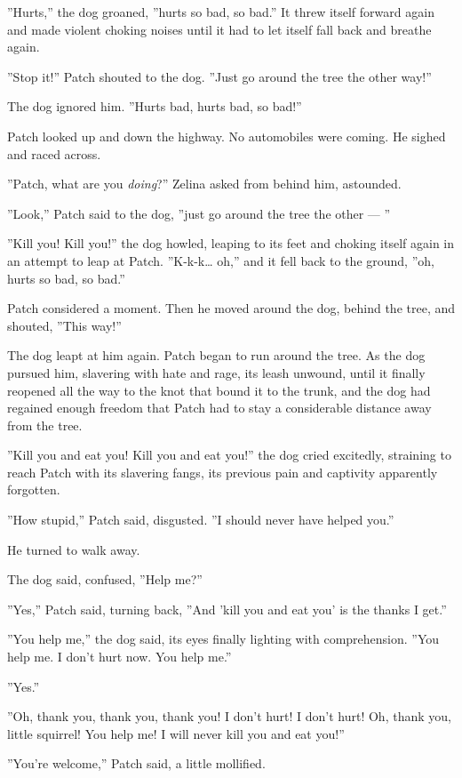 \documentclass[12pt]{book}
\begin{document}
''Hurts,'' the dog groaned, ''hurts so bad, so bad.'' It threw itself forward again and made violent choking noises until it had to let itself fall back and breathe again.

''Stop it!'' Patch shouted to the dog. ''Just go around the tree the other way!''

The dog ignored him. ''Hurts bad, hurts bad, so bad!''

Patch looked up and down the highway. No automobiles were coming. He sighed and raced across.

''Patch, what are you {\it doing}?'' Zelina asked from behind him, astounded.

''Look,'' Patch said to the dog, ''just go around the tree the other ---
''

''Kill you! Kill you!'' the dog howled, leaping to its feet and choking itself again in an attempt to leap at Patch. ''K-k-k\ldots{}
oh,'' and it fell back to the ground, ''oh, hurts so bad, so bad.''

Patch considered a moment. Then he moved around the dog, behind the tree, and shouted, ''This way!''

The dog leapt at him again. Patch began to run around the tree. As the dog pursued him, slavering with hate and rage, its leash unwound, until it finally reopened all the way to the knot that bound it to the trunk, and the dog had regained enough freedom that Patch had to stay a considerable distance away from the tree.

''Kill you and eat you! Kill you and eat you!'' the dog cried excitedly, straining to reach Patch with its slavering fangs, its previous pain and captivity apparently forgotten.

''How stupid,'' Patch said, disgusted. ''I should never have helped you.''

He turned to walk away.

The dog said, confused, ''Help me?''

''Yes,'' Patch said, turning back, ''And 'kill you and eat you' is the thanks I get.''

''You help me,'' the dog said, its eyes finally lighting with comprehension. ''You help me. I don't hurt now. You help me.''

''Yes.''

''Oh, thank you, thank you, thank you! I don't hurt! I don't hurt! Oh, thank you, little squirrel! You help me! I will never kill you and eat you!''

''You're welcome,'' Patch said, a little mollified.
\end{document}

